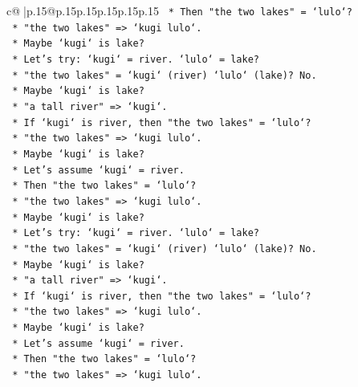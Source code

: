 \documentclass{article}
\begin{document}
{\begin{supertabular}{c@{$\;$}|p{.15\linewidth}@{}p{.15\linewidth}p{.15\linewidth}p{.15\linewidth}p{.15\linewidth}p{.15\linewidth}}
{{{\texttt{                    *   Then "the two lakes" = `lulo`?} \\
\texttt{                    *   "the two lakes" => `kugi lulo`.} \\
\texttt{                    *   Maybe `kugi` is lake?} \\
\texttt{                    *   Let's try: `kugi` = river. `lulo` = lake?} \\
\texttt{                    *   "the two lakes" = `kugi` (river) `lulo` (lake)? No.} \\
\texttt{                    *   Maybe `kugi` is lake?} \\
\texttt{                    *   "a tall river" => `kugi`.} \\
\texttt{                    *   If `kugi` is river, then "the two lakes" = `lulo`?} \\
\texttt{                    *   "the two lakes" => `kugi lulo`.} \\
\texttt{                    *   Maybe `kugi` is lake?} \\
\texttt{                    *   Let's assume `kugi` = river.} \\
\texttt{                    *   Then "the two lakes" = `lulo`?} \\
\texttt{                    *   "the two lakes" => `kugi lulo`.} \\
\texttt{                    *   Maybe `kugi` is lake?} \\
\texttt{                    *   Let's try: `kugi` = river. `lulo` = lake?} \\
\texttt{                    *   "the two lakes" = `kugi` (river) `lulo` (lake)? No.} \\
\texttt{                    *   Maybe `kugi` is lake?} \\
\texttt{                    *   "a tall river" => `kugi`.} \\
\texttt{                    *   If `kugi` is river, then "the two lakes" = `lulo`?} \\
\texttt{                    *   "the two lakes" => `kugi lulo`.} \\
\texttt{                    *   Maybe `kugi` is lake?} \\
\texttt{                    *   Let's assume `kugi` = river.} \\
\texttt{                    *   Then "the two lakes" = `lulo`?} \\
\texttt{                    *   "the two lakes" => `kugi lulo`.} \\
}}}
\end{supertabular}}
\end{document}
